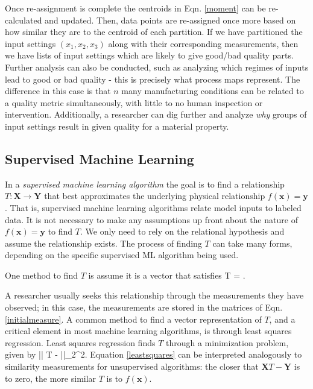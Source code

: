 Once re-assignment is complete the centroids in Eqn. \ref{moment} can be re-calculated and updated.
Then, data points are re-assigned once more based on how similar they are to the centroid of each partition.
If we have partitioned the input settings $(x_1, x_2, x_3)$ along with their corresponding measurements, then we have lists of input settings which are likely to give good/bad quality parts.
Further analysis can also be conducted, such as analyzing which regimes of inputs lead to good or bad quality - this is precisely what process maps represent.
The difference in this case is that $n$ many manufacturing conditions can be related to a quality metric simultaneously, with little to no human inspection or intervention.
Additionally, a researcher can dig further and analyze \textit{why} groups of input settings result in given quality for a material property.



\subsection{Supervised Machine Learning}
In a \textit{supervised machine learning algorithm} the goal is to find a relationship $T: \mathbf{X} \to \mathbf{Y}$ that best approximates the underlying physical relationship $f(\mathbf{x}) = \mathbf{y}$.
That is, supervised machine learning algorithms relate model inputs to labeled data.
It is not necessary to make any assumptions up front about the nature of $f(\mathbf{x}) = \mathbf{y}$ to find $T$.
We only need to rely on the relational hypothesis and assume the relationship exists.
The process of finding $T$ can take many forms, depending on the specific supervised ML algorithm being used.

One method to find $T$ is assume it is a vector that satisfies
\eqn
{}T = .
\label{map}
\equ

A researcher usually seeks this relationship through the measurements they have observed; in this case, the measurements are stored in the matrices of Eqn. \ref{initialmeasure}.
A common method to find a vector representation of $T$, and a critical element in most machine learning algorithms, is through least squares regression. Least squares regression finds $T$ through a minimization problem, given by
\eqn
\min || T -  ||_{2}^{2}.
\label{leastsquares}
\equ
Equation \ref{leastsquares} can be interpreted analogously to similarity measurements for unsupervised algorithms: the closer that $\mathbf{X}T - \mathbf{Y}$ is to zero, the more similar $T$ is to $f(\mathbf{x})$. 

